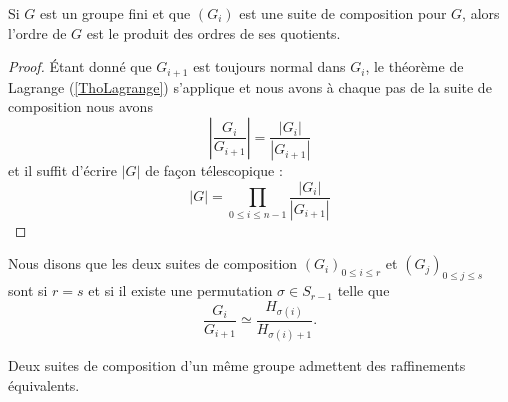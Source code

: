 \begin{proposition}
    Si \( G\) est un groupe fini et que \( (G_i)\) est une suite de composition pour \( G\), alors l'ordre de \( G\) est le produit des ordres de ses quotients.
\end{proposition}

\begin{proof}
    Étant donné que \( G_{i+1}\) est toujours normal dans \( G_i\), le théorème de Lagrange (\ref{ThoLagrange}) s'applique et nous avons à chaque pas de la suite de composition nous avons
    \begin{equation}
        | \frac{ G_i }{ G_{i+1} } |=\frac{ | G_i | }{ | G_{i+1} | }
    \end{equation}
    et il suffit d'écrire \( | G |\) de façon télescopique :
    \begin{equation}
        | G |=\prod_{0\leq i\leq n-1}\frac{ | G_i | }{ | G_{i+1} | }
    \end{equation}
\end{proof}

Nous disons que les deux suites de composition \( (G_i)_{0\leq i\leq r}\) et \( (G_j)_{0\leq j\leq s}\) sont  si \( r=s\) et si il existe une permutation \( \sigma\in S_{r-1}\) telle que
\begin{equation}
    \frac{ G_i }{ G_{i+1} }\simeq\frac{ H_{\sigma(i)} }{ H_{\sigma(i)+1} }.
\end{equation}

\begin{proposition}[Schreider]
    Deux suites de composition d'un même groupe admettent des raffinements équivalents.
\end{proposition}

